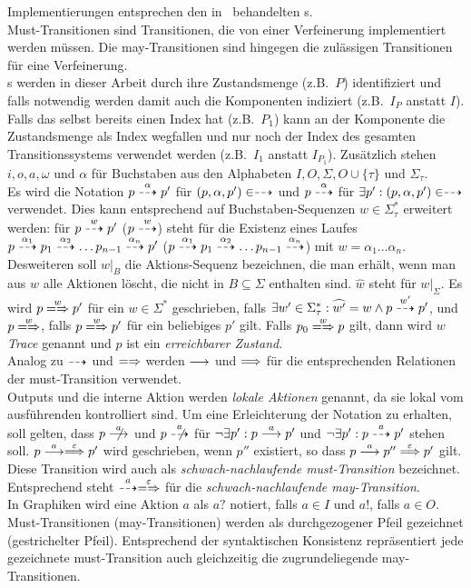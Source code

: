 Implementierungen entsprechen den in~\cite{Schinko2016BA} behandelten
\EIO{}s.\\
Must-Transitionen sind Transitionen, die von einer Verfeinerung implementiert
werden müssen. Die may-Transitionen sind hingegen die zulässigen Transitionen
für eine Verfeinerung.\\
\MEIO{}s  werden in dieser Arbeit durch ihre Zustandsmenge (z.B.\ $P$)
identifiziert und falls notwendig werden damit auch die Komponenten indiziert
(z.B.\ $I_P$ anstatt $I$). Falls das \MEIO{} selbst bereits einen Index hat
(z.B.\ $P_1$) kann an der Komponente die Zustandsmenge als Index wegfallen und
nur noch der Index des gesamten Transitionssystems verwendet werden (z.B.\ $I_1$ anstatt
$I_{P_1}$). Zusätzlich stehen $i,o,a,\omega$ und $\alpha$ für Buchstaben aus
den Alphabeten $I,O,\Sigma ,O\cup\{\tau\}$ und $\Sigma_\tau$.\\
Es wird die Notation $p\may[\alpha] p'$ für $(p,\alpha,p')\in\may$ und
$p\may[\alpha]$ für $\exists p':(p,\alpha,p')\in\may$ verwendet. Dies kann
entsprechend auf Buchstaben-Sequenzen $w\in\Sigma_{\tau}^*$ erweitert werden:
für $p\may[w]p'$ ($p\may[w]$) steht für die Existenz eines Laufes $p\may[\alpha
_1]p_1\may[\alpha _2]\dots p_{n-1}\may[\alpha _n] p'$ ($p\may[\alpha _1] p_1
\may[\alpha _2]\dots p_{n-1}\may[\alpha _n]$) mit $w=\alpha _1\dots \alpha
_n$.\\
Desweiteren soll $w|_B$ die Aktions-Sequenz bezeichnen, die man erhält, wenn
man aus $w$ alle Aktionen löscht, die nicht in $B\subseteq\Sigma$ enthalten
sind. $\widehat{w}$ steht für $w|_{\Sigma}$. Es wird $p\weakmay[w] p'$
für ein $w\in\Sigma ^*$ geschrieben, falls $\exists
w'\in\Sigma_{\tau}^*:\widehat{w'}=w\land p\may[w']p'$, und $p\weakmay[w]$,
falls $p\weakmay[w] p'$ für ein beliebiges $p'$ gilt. Falls $p_0\weakmay[w] p$
gilt, dann wird $w$ \emph{Trace} genannt und $p$ ist ein \emph{erreichbarer
Zustand}.\\
Analog zu $\may$ und $\weakmay$ werden $\must$ und $\weakmust$ für die
entsprechenden Relationen der must-Transition verwendet.\\
Outputs und die interne Aktion werden \emph{lokale Aktionen} genannt, da sie
lokal vom ausführenden \MEIO{} kontrolliert sind. Um eine Erleichterung der
Notation zu erhalten, soll gelten, dass $p\nmust[a]$ und $p\nmay[a]$ für
$\neg\exists p': p\must[a]p'$ und $\neg\exists p': p\may[a]p'$ stehen soll.
$p\must[a]\weakmust[\varepsilon]p'$ wird geschrieben, wenn $p''$ existiert, so
dass $p\must[a]p''\weakmust[\varepsilon]p'$ gilt. Diese Transition wird auch
als \emph{schwach-nachlaufende must-Transition} bezeichnet. Entsprechend steht
$\may[a]\weakmay[\varepsilon]$ für die \emph{schwach-nachlaufende
may-Transition}.\\
In Graphiken wird eine Aktion $a$ als $a?$ notiert, falls $a\in I$ und $a!$,
falls $a\in O$. Must-Transitionen (may-Transitionen) werden als durchgezogener
Pfeil gezeichnet (gestrichelter Pfeil). Entsprechend der syntaktischen
Konsistenz repräsentiert jede gezeichnete must-Transition auch gleichzeitig die
zugrundeliegende may-Transitionen.

